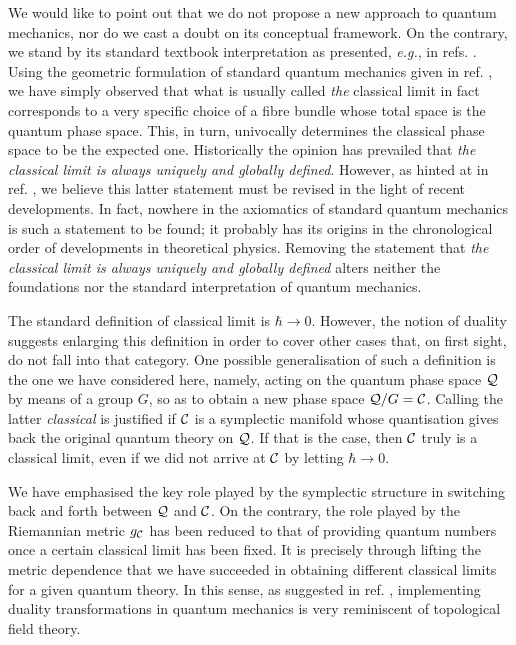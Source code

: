 \documentclass[a4paper,a4paper]{article}
\begin{document}
We would like to point out that we do not propose a new approach to 
quantum mechanics, nor do we cast a doubt on its conceptual framework. 
On the contrary, we stand by its standard textbook interpretation as presented, 
{\it e.g.}, in refs. \cite{GALINDO, DR}. 
Using the geometric formulation of standard quantum mechanics given in ref. \cite{ASHTEKAR},
we have simply observed that what is usually called {\it the} classical limit 
in fact corresponds to a very specific choice of a fibre bundle whose total 
space is the quantum phase space. This, in turn, univocally determines the 
classical phase space to be the expected one.  Historically the opinion has 
prevailed that {\it the classical limit is always uniquely and globally defined}. 
However, as hinted at in ref. \cite{VAFA}, we believe this latter statement must be revised 
in the light of recent developments. In fact, nowhere in the axiomatics of standard quantum 
mechanics is such a statement to be found; it probably has its origins in the chronological 
order of developments in theoretical physics. Removing the statement that 
{\it the classical limit is always uniquely and globally defined} alters neither the foundations 
nor the standard interpretation of quantum mechanics. 

The standard definition of classical limit is $\hbar\to 0$.
However, the notion of duality suggests enlarging this definition 
in order to cover other cases that, on first sight, do not fall into that category.
One possible generalisation of such a definition is the one we have 
considered here, namely, acting on the quantum phase space ${\cal Q}$ by 
means of a group $G$, so as to obtain a new phase space ${\cal Q}/G={\cal C}$. 
Calling the latter {\it classical} is justified if ${\cal C}$ is a 
symplectic manifold whose quantisation gives back the original 
quantum theory on ${\cal Q}$. If that is the case, then ${\cal C}$ truly 
is a classical limit, even if we did not arrive at ${\cal C}$ by letting 
$\hbar \to 0$.

We have emphasised the key role played by the symplectic structure in switching 
back and forth between ${\cal Q}$ and ${\cal C}$. On the contrary, the role played 
by the Riemannian metric $g_{\cal C}$ has been reduced to 
that of providing quantum numbers once a certain classical limit has 
been fixed. It is precisely through lifting the metric dependence that we
have succeeded in obtaining different classical limits for a given quantum 
theory. In this sense, as suggested in ref. \cite{NOS}, implementing 
duality transformations in quantum mechanics is very reminiscent of 
topological field theory. 
\end{document}

